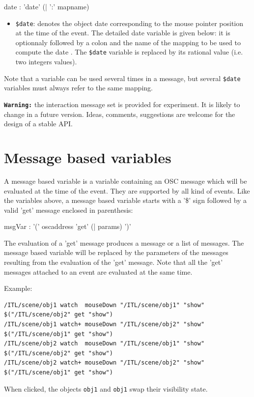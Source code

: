 \documentclass[a4paper,twoside]{report}
\newcommand{\sublevel}[1]	{\section{#1}}
\newcommand{\OSC}[1]		{\texttt{#1}}
\begin{document}
\begin{rail} 
date : 'date' (| ':'  mapname)
\end{rail}

\begin{itemize}
\item \OSC{\$date}: denotes the object date corresponding to the mouse pointer position at the time of the event. The detailed date variable is given below: it is optionnaly followed by a colon and the name of the mapping to be used to compute the date . The \OSC{\$date} variable is replaced by its rational value (i.e. two integers values). 
\end{itemize}

Note that a variable can be used several times in a message, but several \OSC{\$date} variables must always refer to the same mapping.

\vspace{5mm}
\texttt{\textbf{Warning:}} the interaction message set is provided for experiment. It is likely to change in a future version. Ideas, comments, suggestions are welcome for the design of a stable API.

\sublevel{Message based variables}
\label{msgvar}

A message based variable is a variable containing an OSC message which will be evaluated at the time of the event. They are supported by all kind of events. Like  the variables above, a message based variable starts with a '\$' sign followed by a valid 'get' message enclosed in parenthesis:
\begin{rail} 
msgVar : '(' oscaddress 'get' (| params) ')'
\end{rail}

The evaluation of a 'get' message produces a message or a list of messages. The message based variable will be replaced by the parameters of the messages resulting from the evaluation of the 'get' message.
Note that all the 'get' messages attached to an event are evaluated at the same time.

Example:
{\small \begin{verbatim}
/ITL/scene/obj1 watch  mouseDown "/ITL/scene/obj1" "show" $("/ITL/scene/obj2" get "show")
/ITL/scene/obj1 watch+ mouseDown "/ITL/scene/obj2" "show" $("/ITL/scene/obj1" get "show")
/ITL/scene/obj2 watch  mouseDown "/ITL/scene/obj1" "show" $("/ITL/scene/obj2" get "show")
/ITL/scene/obj2 watch+ mouseDown "/ITL/scene/obj2" "show" $("/ITL/scene/obj1" get "show")
\end{verbatim}
}
When clicked, the objects \OSC{obj1} and \OSC{obj1} swap their visibility state.
\end{document}
